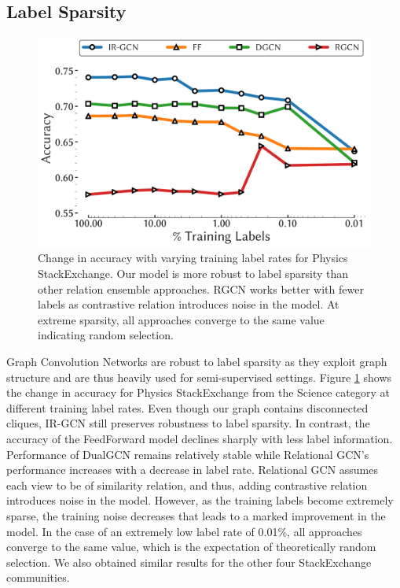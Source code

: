 \subsection{Label Sparsity}

\begin{figure}[h]
      \centering
  \includegraphics[scale=0.5]{figures/sparsity_acc_physics.pdf}
  \caption{\label{fig:labelsparsity} Change in accuracy with varying training label rates for Physics StackExchange. Our model is more robust to label sparsity than other relation ensemble approaches. RGCN works better with fewer labels as contrastive relation introduces noise in the model. At extreme sparsity, all approaches converge to the same value indicating random selection.}
\end{figure}
Graph Convolution Networks are robust to label sparsity as they exploit graph structure and are thus heavily used for semi-supervised settings. Figure \ref{fig:labelsparsity} shows the change in accuracy for Physics StackExchange from the Science category at different training label rates. Even though our graph contains disconnected cliques, IR-GCN still preserves robustness to label sparsity.
In contrast, the accuracy of the FeedForward model declines sharply with less label information. Performance of DualGCN remains relatively stable while Relational GCN's performance increases with a decrease in label rate. Relational GCN assumes each view to be of similarity relation, and thus, adding contrastive relation introduces noise in the model. However, as the training labels become extremely sparse, the training noise decreases that leads to a marked improvement in the model. In the case of an extremely low label rate of 0.01\%, all approaches converge to the same value, which is the expectation of theoretically random selection. We also obtained similar results for the other four StackExchange communities.


